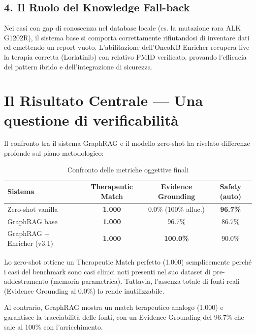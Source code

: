 \documentclass[12pt, a4paper]{article}
\begin{document}
\subsection{4. Il Ruolo del Knowledge Fall-back}
Nei casi con gap di conoscenza nel database locale (es. la mutazione rara ALK G1202R), il sistema base si comporta correttamente rifiutandosi di inventare dati ed emettendo un report vuoto. L'abilitazione dell'OncoKB Enricher recupera live la terapia corretta (Lorlatinib) con relativo PMID verificato, provando l'efficacia del pattern ibrido e dell'integrazione di sicurezza.

\section{Il Risultato Centrale --- Una questione di verificabilità}
Il confronto tra il sistema GraphRAG e il modello zero-shot ha rivelato differenze profonde sul piano metodologico:

\begin{table}[ht]
\centering\renewcommand{\arraystretch}{1.3}
\caption{Confronto delle metriche oggettive finali}
\begin{tabular}{lccc}
\toprule
\rowcolor{primaryblue}
\color{white}\textbf{Sistema} & \color{white}\textbf{Therapeutic Match} & \color{white}\textbf{Evidence Grounding} & \color{white}\textbf{Safety (auto)} \\
\midrule
Zero-shot vanilla & \textbf{1.000} & 0.0\% (100\% alluc.) & \textbf{96.7\%} \\
\rowcolor{roweven}
GraphRAG base & \textbf{1.000} & 96.7\% & 86.7\% \\
GraphRAG + Enricher (v3.1) & \textbf{1.000} & \textbf{100.0\%} & 90.0\% \\
\bottomrule
\end{tabular}
\end{table}

Lo zero-shot ottiene un Therapeutic Match perfetto (1.000) semplicemente perché i casi del benchmark sono casi clinici noti presenti nel suo dataset di pre-addestramento (memoria parametrica). Tuttavia, l'assenza totale di fonti reali (Evidence Grounding al 0.0\%) lo rende inutilizzabile.

Al contrario, GraphRAG mostra un match terapeutico analogo (1.000) e garantisce la tracciabilità delle fonti, con un Evidence Grounding del 96.7\% che sale al 100\% con l'arricchimento.
\end{document}
